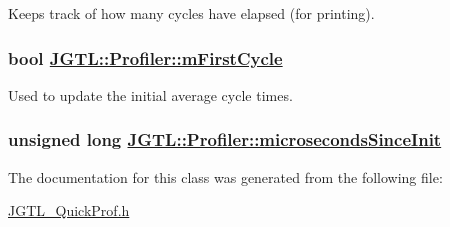 Keeps track of how many cycles have elapsed (for printing). 

\hypertarget{class_j_g_t_l_1_1_profiler_32a05ea51b894c089796b6fa0e5d2aa9}{
\subsubsection[mFirstCycle]{\setlength{\rightskip}{0pt plus 5cm}bool \hyperlink{class_j_g_t_l_1_1_profiler_32a05ea51b894c089796b6fa0e5d2aa9}{JGTL::Profiler::m\-First\-Cycle}}}
\label{class_j_g_t_l_1_1_profiler_32a05ea51b894c089796b6fa0e5d2aa9}


Used to update the initial average cycle times. 

\hypertarget{class_j_g_t_l_1_1_profiler_c85e5809a50c45b86ac345af710da5c3}{
\subsubsection[microsecondsSinceInit]{\setlength{\rightskip}{0pt plus 5cm}unsigned long \hyperlink{class_j_g_t_l_1_1_profiler_c85e5809a50c45b86ac345af710da5c3}{JGTL::Profiler::microseconds\-Since\-Init}}}
\label{class_j_g_t_l_1_1_profiler_c85e5809a50c45b86ac345af710da5c3}




The documentation for this class was generated from the following file:\begin{CompactItemize}
\item 
\hyperlink{_j_g_t_l___quick_prof_8h}{JGTL\_\-Quick\-Prof.h}\end{CompactItemize}
